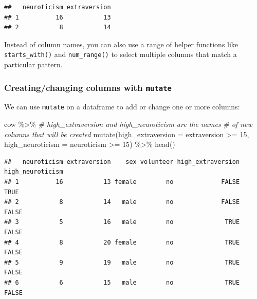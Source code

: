 \documentclass[
]{book}
\newenvironment{Shaded}{\begin{snugshade}}{\end{snugshade}}
\newcommand{\AttributeTok}[1]{\textcolor[rgb]{0.77,0.63,0.00}{#1}}
\newcommand{\CommentTok}[1]{\textcolor[rgb]{0.56,0.35,0.01}{\textit{#1}}}
\newcommand{\DecValTok}[1]{\textcolor[rgb]{0.00,0.00,0.81}{#1}}
\newcommand{\FunctionTok}[1]{\textcolor[rgb]{0.00,0.00,0.00}{#1}}
\newcommand{\NormalTok}[1]{#1}
\newcommand{\SpecialCharTok}[1]{\textcolor[rgb]{0.00,0.00,0.00}{#1}}
\begin{document}
\begin{verbatim}
##   neuroticism extraversion
## 1          16           13
## 2           8           14
\end{verbatim}

Instead of column names, you can also use a range of helper functions
like \texttt{starts\_with()} and \texttt{num\_range()} to select multiple columns
that match a particular pattern.

\hypertarget{creatingchanging-columns-with-mutate}{%
\subsubsection*{\texorpdfstring{Creating/changing columns with \texttt{mutate}}{Creating/changing columns with mutate}}\label{creatingchanging-columns-with-mutate}}

We can use \texttt{mutate} on a dataframe to add or change one or more columns:

\begin{Shaded}
\begin{Highlighting}[]
\NormalTok{cow }\SpecialCharTok{\%\textgreater{}\%}
    \CommentTok{\# high\_extraversion and high\_neuroticism are the names}
    \CommentTok{\#   of new columns that will be created}
    \FunctionTok{mutate}\NormalTok{(}\AttributeTok{high\_extraversion =}\NormalTok{ extraversion }\SpecialCharTok{\textgreater{}=} \DecValTok{15}\NormalTok{,}
           \AttributeTok{high\_neuroticism =}\NormalTok{ neuroticism }\SpecialCharTok{\textgreater{}=} \DecValTok{15}\NormalTok{) }\SpecialCharTok{\%\textgreater{}\%}
    \FunctionTok{head}\NormalTok{()}
\end{Highlighting}
\end{Shaded}

\begin{verbatim}
##   neuroticism extraversion    sex volunteer high_extraversion high_neuroticism
## 1          16           13 female        no             FALSE             TRUE
## 2           8           14   male        no             FALSE            FALSE
## 3           5           16   male        no              TRUE            FALSE
## 4           8           20 female        no              TRUE            FALSE
## 5           9           19   male        no              TRUE            FALSE
## 6           6           15   male        no              TRUE            FALSE
\end{verbatim}
\end{document}
